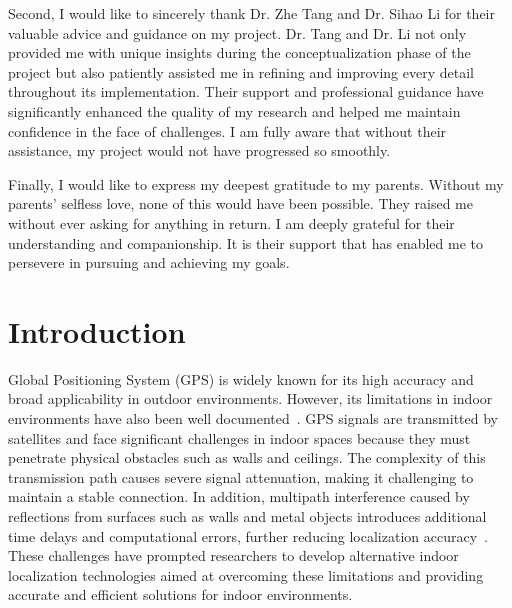 \documentclass[12pt,a4paper]{article}
\numberwithin{equation}{section}
\begin{document}
Second, I would like to sincerely thank Dr. Zhe Tang and Dr. Sihao Li for their
valuable advice and guidance on my project. Dr. Tang and Dr. Li not only
provided me with unique insights during the conceptualization phase of the
project but also patiently assisted me in refining and improving every detail
throughout its implementation. Their support and professional guidance have
significantly enhanced the quality of my research and helped me maintain
confidence in the face of challenges. I am fully aware that without their
assistance, my project would not have progressed so smoothly.

Finally, I would like to express my deepest gratitude to my parents. Without my
parents' selfless love, none of this would have been possible. They raised me
without ever asking for anything in return. I am deeply grateful for their
understanding and companionship. It is their support that has enabled me to
persevere in pursuing and achieving my goals.


\newpage

\tableofcontents
\newpage

\listoftables
\newpage

\listoffigures
\newpage

\printnomenclature



\newpage

\section{Introduction}
Global Positioning System (GPS)  is
widely known for its high accuracy and broad applicability in outdoor
environments. However, its limitations in indoor environments have also been
well documented~\cite{wahab2022indoor}. GPS signals are transmitted by
satellites and face significant challenges in indoor spaces because they must
penetrate physical obstacles such as walls and ceilings. The complexity of this
transmission path causes severe signal attenuation, making it challenging to
maintain a stable connection. In addition, multipath interference caused by
reflections from surfaces such as walls and metal objects introduces additional
time delays and computational errors, further reducing localization
accuracy~\cite{wahab2022indoor}. These challenges have prompted researchers to
develop alternative indoor localization technologies aimed at overcoming these
limitations and providing accurate and efficient solutions for indoor
environments.
\end{document}
